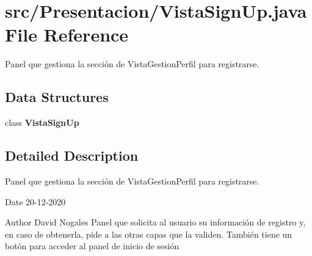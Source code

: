 \section{src/\+Presentacion/\+Vista\+Sign\+Up.java File Reference}
\label{_vista_sign_up_8java}


Panel que gestiona la sección de Vista\+Gestion\+Perfil para registrarse.  


\subsection*{Data Structures}
\begin{DoxyCompactItemize}
\item 
class \textbf{ Vista\+Sign\+Up}
\end{DoxyCompactItemize}


\subsection{Detailed Description}
Panel que gestiona la sección de Vista\+Gestion\+Perfil para registrarse. 

\begin{DoxyDate}{Date}
20-\/12-\/2020 
\end{DoxyDate}
\begin{DoxyAuthor}{Author}
David Nogales Panel que solicita al usuario su información de registro y, en caso de obtenerla, pide a las otras capas que la validen. También tiene un botón para acceder al panel de inicio de sesión 
\end{DoxyAuthor}
